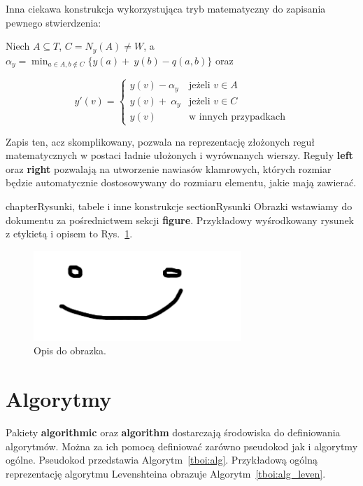 \documentclass[twoside,a4paper]{book}
\begin{document}
Inna ciekawa konstrukcja wykorzystująca tryb matematyczny do zapisania pewnego stwierdzenia:

Niech $A \subseteq T$, $C = N_y(A) \neq W$, a~$\alpha_y = \min_{a \in A, b\notin C} \{y(a) +~y(b) - q(a, b)\}$ oraz

\[ y'(v) = \left\{ \begin{array}{ll}
                y(v) - \alpha_y & \mbox{jeżeli $v \in A$} \\
                y(v) +~\alpha_y & \mbox{jeżeli $v \in C$} \\
                y(v)            & \mbox{w innych przypadkach}
               \end{array}
       \right. \]

Zapis ten, acz skomplikowany, pozwala na reprezentację złożonych reguł matematycznych w postaci ładnie ułożonych i wyrównanych wierszy. Reguły \textbf{left} oraz \textbf{right} pozwalają na utworzenie nawiasów klamrowych, których rozmiar będzie automatycznie dostosowywany do rozmiaru elementu, jakie mają zawierać.

chapter{Rysunki, tabele i inne konstrukcje}
\enlargethispage{20pt}
section{Rysunki}
\label{rysunki}
Obrazki wstawiamy do dokumentu za pośrednictwem sekcji \textbf{figure}. Przykładowy wyśrodkowany rysunek z etykietą i opisem to Rys.~\ref{fig:obrazek}.

\begin{figure}[!h]
\centering
\includegraphics[width=0.7\textwidth]{img/obrazek.png}
\caption{Opis do obrazka.}
\label{fig:obrazek}
\end{figure}

\section{Algorytmy}
\label{algorytmy}
Pakiety \textbf{algorithmic} oraz \textbf{algorithm} dostarczają środowiska do definiowania algorytmów. Można za ich pomocą definiować zarówno pseudokod jak i algorytmy ogólne. Pseudokod przedstawia Algorytm~\ref{tboi:alg}. Przykładową ogólną reprezentację algorytmu Levenshteina obrazuje Algorytm~\ref{tboi:alg_leven}.
\end{document}
